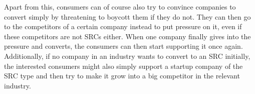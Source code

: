 \documentclass{article}
\begin{document}
Apart from this, consumers can of course also try to convince companies to convert simply by threatening to boycott them if they do not. They can then go to the competitors of a certain company instead to put pressure on it, even if these competitors are not SRCs either. When one company finally gives into the pressure and converts, the consumers can then start supporting it once again. Additionally, if no company in an industry wants to convert to an SRC initially, the interested consumers might also simply support a startup company of the SRC type and then try to make it grow into a big competitor in the relevant industry.



\end{document}
